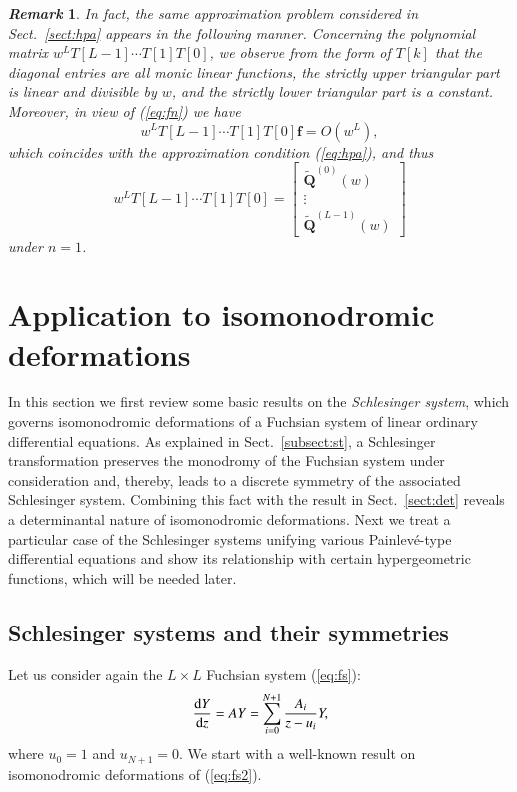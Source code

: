\documentclass[12pt]{article}
\newtheorem{remark}[thm]{\it Remark}
\numberwithin{equation}{section}
\begin{document}
\begin{remark}\rm
In fact,
the same approximation problem considered in Sect.~\ref{sect:hpa} 
appears in the following manner.
Concerning the polynomial matrix $w^LT[L-1]\cdots T[1]T[0] $,
we observe from the form of $T[k]$ that
the diagonal entries are all monic linear functions,
the strictly upper triangular part is linear and divisible by $w$,
and 
the strictly lower triangular part is a constant.  
Moreover,
in view of (\ref{eq:fn}) we have
\[
w^LT[L-1]\cdots T[1]T[0] {\boldsymbol f}=O(w^L),
\]
which coincides with the approximation condition (\ref{eq:hpa}), and thus
\[
w^LT[L-1]\cdots T[1]T[0] =
\begin{bmatrix} 
\widetilde{\boldsymbol Q}^{(0)}(w)
\\
\vdots
\\
\widetilde{\boldsymbol Q}^{(L-1)}(w)
\end{bmatrix}
\]
under $n=1$.
\end{remark}




\section{Application to  isomonodromic deformations}
\label{sect:aid}


In this section we first 
review some basic results on
 the {\it Schlesinger system},
which 
governs
isomonodromic deformations of a
Fuchsian system
of linear ordinary differential equations. 
As explained in Sect.~\ref{subsect:st},
a Schlesinger transformation preserves the monodromy of the 
Fuchsian system under consideration 
and, thereby, 
leads to a discrete symmetry of the associated Schlesinger system.
Combining this fact with the result in Sect.~\ref{sect:det}
reveals a determinantal nature of
isomonodromic deformations.
Next we 
treat
a particular case of 
the Schlesinger systems
unifying various Painlev\'e-type differential 
equations
and show its relationship with certain hypergeometric functions,
which will be needed later.

\subsection{Schlesinger systems and their symmetries}
\label{subsect:ss}


Let us consider again the $L \times L$ Fuchsian system (\ref{eq:fs}):
\begin{equation}
\label{eq:fs2}
\frac{{\rm d} Y}{{\rm d} z}
=A Y
=\sum_{i=0}^{N+1} \frac{A_i}{z-u_i} Y,
\end{equation}
where $u_0=1$ and $u_{N+1}=0$.
We start with 
a well-known result on isomonodromic deformations
of (\ref{eq:fs2}).
\end{document}
